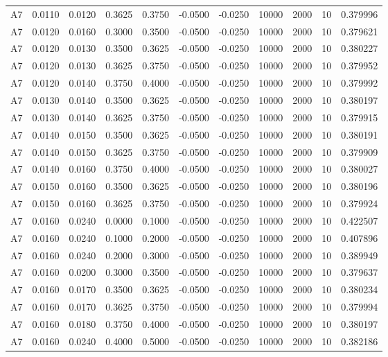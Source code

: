 \documentclass{article}
\begin{document}
\begin{longtable}{l r r r r r r r r r l}
A7 & 0.0110 & 0.0120 & 0.3625 & 0.3750 & -0.0500 & -0.0250 & 10000 & 2000 & 10 & 0.379996 \\
A7 & 0.0120 & 0.0160 & 0.3000 & 0.3500 & -0.0500 & -0.0250 & 10000 & 2000 & 10 & 0.379621 \\
A7 & 0.0120 & 0.0130 & 0.3500 & 0.3625 & -0.0500 & -0.0250 & 10000 & 2000 & 10 & 0.380227 \\
A7 & 0.0120 & 0.0130 & 0.3625 & 0.3750 & -0.0500 & -0.0250 & 10000 & 2000 & 10 & 0.379952 \\
A7 & 0.0120 & 0.0140 & 0.3750 & 0.4000 & -0.0500 & -0.0250 & 10000 & 2000 & 10 & 0.379992 \\
A7 & 0.0130 & 0.0140 & 0.3500 & 0.3625 & -0.0500 & -0.0250 & 10000 & 2000 & 10 & 0.380197 \\
A7 & 0.0130 & 0.0140 & 0.3625 & 0.3750 & -0.0500 & -0.0250 & 10000 & 2000 & 10 & 0.379915 \\
A7 & 0.0140 & 0.0150 & 0.3500 & 0.3625 & -0.0500 & -0.0250 & 10000 & 2000 & 10 & 0.380191 \\
A7 & 0.0140 & 0.0150 & 0.3625 & 0.3750 & -0.0500 & -0.0250 & 10000 & 2000 & 10 & 0.379909 \\
A7 & 0.0140 & 0.0160 & 0.3750 & 0.4000 & -0.0500 & -0.0250 & 10000 & 2000 & 10 & 0.380027 \\
A7 & 0.0150 & 0.0160 & 0.3500 & 0.3625 & -0.0500 & -0.0250 & 10000 & 2000 & 10 & 0.380196 \\
A7 & 0.0150 & 0.0160 & 0.3625 & 0.3750 & -0.0500 & -0.0250 & 10000 & 2000 & 10 & 0.379924 \\
A7 & 0.0160 & 0.0240 & 0.0000 & 0.1000 & -0.0500 & -0.0250 & 10000 & 2000 & 10 & 0.422507 \\
A7 & 0.0160 & 0.0240 & 0.1000 & 0.2000 & -0.0500 & -0.0250 & 10000 & 2000 & 10 & 0.407896 \\
A7 & 0.0160 & 0.0240 & 0.2000 & 0.3000 & -0.0500 & -0.0250 & 10000 & 2000 & 10 & 0.389949 \\
A7 & 0.0160 & 0.0200 & 0.3000 & 0.3500 & -0.0500 & -0.0250 & 10000 & 2000 & 10 & 0.379637 \\
A7 & 0.0160 & 0.0170 & 0.3500 & 0.3625 & -0.0500 & -0.0250 & 10000 & 2000 & 10 & 0.380234 \\
A7 & 0.0160 & 0.0170 & 0.3625 & 0.3750 & -0.0500 & -0.0250 & 10000 & 2000 & 10 & 0.379994 \\
A7 & 0.0160 & 0.0180 & 0.3750 & 0.4000 & -0.0500 & -0.0250 & 10000 & 2000 & 10 & 0.380197 \\
A7 & 0.0160 & 0.0240 & 0.4000 & 0.5000 & -0.0500 & -0.0250 & 10000 & 2000 & 10 & 0.382186 \\

\end{longtable}
\end{document}
